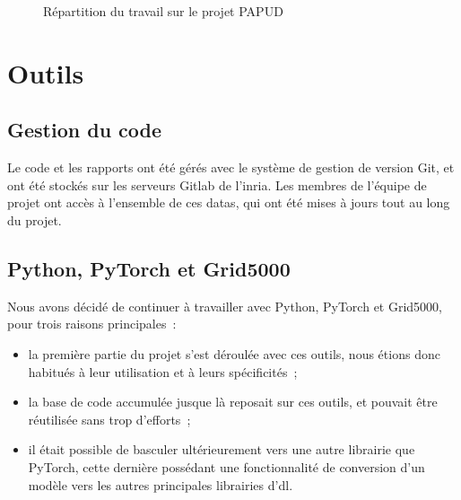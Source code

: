 \begin{figure}[ht]
	\centering
	\caption[Répartition du travail sur le projet PAPUD]{Répartition du travail sur le projet PAPUD}\label{fig:papud_time}
\end{figure}

\section{Outils}
\subsection{Gestion du code}
Le code et les rapports ont été gérés avec le système de gestion de version Git, et ont été stockés sur les serveurs Gitlab de l'\gls{inria}. Les membres de l'équipe de projet ont accès à l'ensemble de ces \glspl{data}, qui ont été mises à jours tout au long du projet.

\subsection{Python, PyTorch et Grid5000}
Nous avons décidé de continuer à travailler avec Python, PyTorch et Grid5000, pour trois raisons principales~:
\begin{itemize}
	\item la première partie du projet s'est déroulée avec ces outils, nous étions donc habitués à leur utilisation et à leurs spécificités~;
	\item la base de code accumulée jusque là reposait sur ces outils, et pouvait être réutilisée sans trop d'efforts~;
	\item il était possible de basculer ultérieurement vers une autre librairie que  PyTorch, cette dernière possédant une fonctionnalité de conversion d'un modèle vers les autres principales librairies d'\gls{dl}.
\end{itemize}